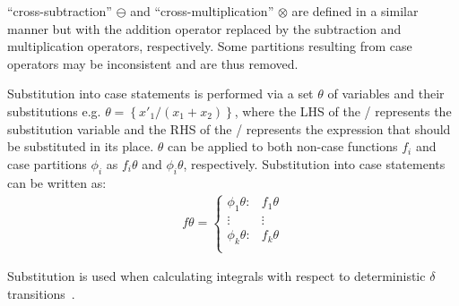 \noindent ``cross-subtraction'' $\ominus$ and ``cross-multiplication'' $\otimes$ are defined in a similar manner but with the addition operator replaced by the subtraction and multiplication operators, respectively. Some partitions resulting from case operators may be inconsistent and are thus removed.

Substitution into case statements is performed via a set $\theta$ of variables and their substitutions e.g. $\theta = \left\{ x'_1/(x_1 + x_2) \right\}$, where the LHS of the / represents the substitution variable and the RHS of the / represents the expression that should be substituted in its place. $\theta$ can be applied to both non-case functions $f_i$ and case partitions $\phi_i$ as $f_i\theta$ and $\phi_i\theta$, respectively. Substitution into case statements can be written as:
{\footnotesize 
    \abovedisplayskip=5pt
    \belowdisplayskip=0pt
    \begin{align*}
        f\theta = 
        \begin{cases}
            \phi_1\theta: & f_1\theta \\ 
            \vdots & \vdots\\ 
            \phi_k\theta: & f_k\theta \\ 
        \end{cases}
    \end{align*}
}%

Substitution is used when calculating integrals with respect to deterministic $\delta$  transitions~\parencite{Sanner_UAI_2011}.


